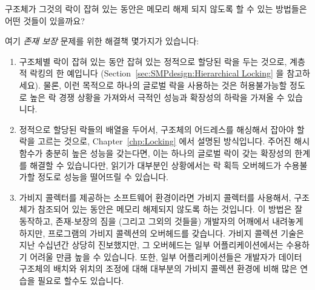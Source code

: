 \begin{enumerate}
\QuickQ{}
	구조체가 그것의 락이 잡혀 있는 동안은 메모리 해제 되지 않도록 할 수
	있는 방법들은 어떤 것들이 있을까요?

\QuickA{}
	여기 \emph{존재 보장} 문제를 위한 해결책 몇가지가 있습니다:

	\begin{enumerate}
	\item	구조체별 락이 잡혀 있는 동안 잡혀 있는 정적으로 할당된 락을
		두는 것으로, 계층적 락킹의 한 예입니다
		(Section~\ref{sec:SMPdesign:Hierarchical Locking} 을
		참고하세요).
		물론, 이런 목적으로 하나의 글로벌 락을 사용하는 것은
		허용불가능할 정도로 높은 락 경쟁 상황을 가져와서 극적인 성능과
		확장성의 하락을 가져올 수 있습니다.
	\item	정적으로 할당된 락들의 배열을 두어서, 구조체의 어드레스를
		해싱해서 잡아야 할 락을 고르는 것으로,
		Chapter~\ref{chp:Locking} 에서 설명된 방식입니다.
		주어진 해시 함수가 충분히 높은 성능을 갖는다면, 이는 하나의
		글로벌 락이 갖는 확장성의 한계를 해결할 수 있습니다만, 읽기가
		대부분인 상황에서는 락 획득 오버헤드가 수용불가할 정도로 성능을
		떨어뜨릴 수 있습니다.
	\item	가비지 콜렉터를 제공하는 소프트웨어 환경이라면 가비지 콜렉터를
		사용해서, 구조체가 참조되어 있는 동안은 메모리 해제되지 않도록
		하는 것입니다.
		이 방법은 잘 동작하고, 존재-보장의 짐을 (그리고 그외의 것들을)
		개발자의 어깨에서 내려놓게 하지만, 프로그램의 가비지 콜렉션의
		오버헤드를 갖습니다.
		가비지 콜렉션 기술은 지난 수십년간 상당히 진보했지만, 그
		오버헤드는 일부 어플리케이션에서는 수용하기 어려울 만큼 높을 수
		있습니다.
		또한, 일부 어플리케이션들은 개발자가 데이터 구조체의 배치와
		위치의 조정에 대해 대부분의 가비지 콜렉션 환경에 비해 많은
		연습을 필요로 할수도 있습니다.
	\iffalse


\end{enumerate}
\end{enumerate}
